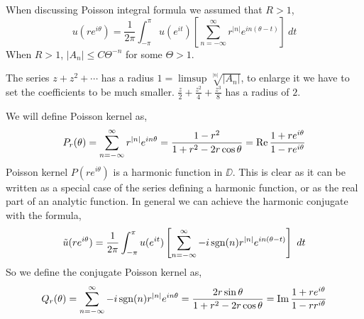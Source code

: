 When discussing Poisson integral formula we assumed that $R > 1$,
\[
	u(r e^{i \theta})
	= \frac{1}{2 \pi} \int_{-\pi}^{\pi} u(e^{i t}) \left[ \sum_{n = -\infty}^\infty r^{|n|} e^{i n (\theta - t)} \right]\ dt
\]
When $R > 1$, $|A_n| \le C \Theta^{-n}$ for some $\Theta > 1$.
\begin{example}
	The series $z + z^2 + \cdots$ has a radius $1 = \limsup \sqrt[|n|]{|A_n|}$, to enlarge it we have to set the coefficients to be much smaller.
	$\frac{z}{2} + \frac{z^2}{4} + \frac{z^3}{8}$ has a radius of $2$.
\end{example}
We will define Poisson kernel as,
\[
	P_r(\theta)
	= \sum_{n = -\infty}^\infty r^{|n|} e^{i n \theta}
	= \frac{1 - r^2}{1 + r^2 - 2 r \cos \theta}
	= \operatorname{Re} \frac{1 + r e^{i \theta}}{1 - r e^{i \theta}}
\]
Poisson kernel $P(r e^{i \theta})$ is a harmonic function in $\DD$.
This is clear as it can be written as a special case of the series defining a harmonic function, or as the real part of an analytic function.
In general we can achieve the harmonic conjugate with the formula,
\[
	\tilde{u}(r e^{i \theta})
	= \frac{1}{2 \pi} \int_{-\pi}^{\pi} u(e^{i t}) \left[ \sum_{n = -\infty}^\infty -i \sgn(n) r^{|n|} e^{i n (\theta - t)} \right]\ dt
\]
So we define the conjugate Poisson kernel as,
\[
	Q_r(\theta)
	= \sum_{n = -\infty}^\infty -i \operatorname{sgn}(n) r^{|n|} e^{i n \theta}
	= \frac{2 r \sin \theta}{1 + r^2 - 2 r \cos \theta}
	= \operatorname{Im} \frac{1 + r e^{i \theta}}{1 - r r^{i \theta}}
\]

